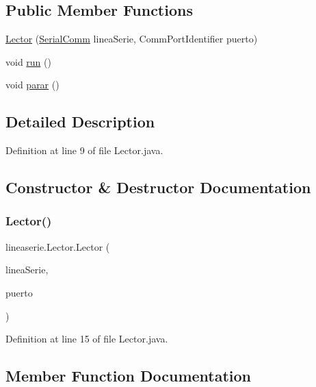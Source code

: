 \subsection*{Public Member Functions}
\begin{DoxyCompactItemize}
\item 
\mbox{\hyperlink{classlineaserie_1_1_lector_a49947c6538f2b7e0b423b7664c252ed3}{Lector}} (\mbox{\hyperlink{classlineaserie_1_1_serial_comm}{Serial\+Comm}} linea\+Serie, Comm\+Port\+Identifier puerto)
\item 
void \mbox{\hyperlink{classlineaserie_1_1_lector_ac57211de70ab9a4bd7aa80ab491f7fca}{run}} ()
\item 
void \mbox{\hyperlink{classlineaserie_1_1_lector_a7abfb09ecc456931b8948a058cedf4c8}{parar}} ()
\end{DoxyCompactItemize}


\subsection{Detailed Description}


Definition at line 9 of file Lector.\+java.



\subsection{Constructor \& Destructor Documentation}
\mbox{\label{classlineaserie_1_1_lector_a49947c6538f2b7e0b423b7664c252ed3}} 
\subsubsection{\texorpdfstring{Lector()}{Lector()}}
{\footnotesize\ttfamily lineaserie.\+Lector.\+Lector (\begin{DoxyParamCaption}\item[{\mbox{\hyperlink{classlineaserie_1_1_serial_comm}{Serial\+Comm}}}]{linea\+Serie,  }\item[{Comm\+Port\+Identifier}]{puerto }\end{DoxyParamCaption})}



Definition at line 15 of file Lector.\+java.



\subsection{Member Function Documentation}
\mbox{\label{classlineaserie_1_1_lector_a7abfb09ecc456931b8948a058cedf4c8}} 
